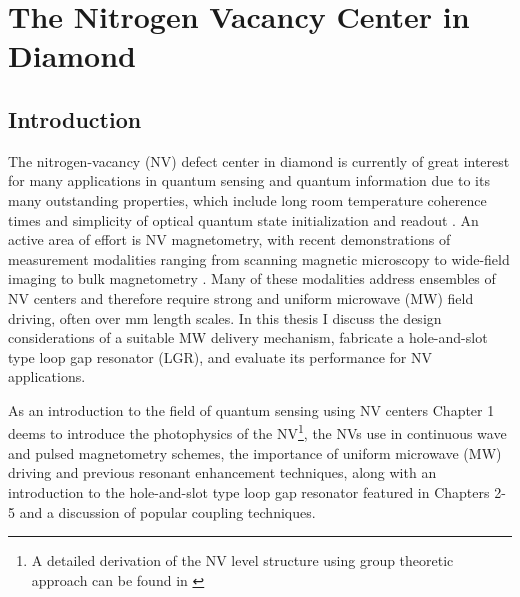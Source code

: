 
\chapter{The Nitrogen Vacancy Center in Diamond}

\section{Introduction}

The nitrogen-vacancy (NV) defect center in diamond is currently of great interest for many applications in quantum sensing \cite{taylor2008high,balasubramanian2008nanoscale,dolde2011electric,neumann2013high, degen2008scanning,hodges2013timekeeping} and quantum information \cite{childress2013diamond,gaebel2006room,dutt2007quantum} due to its many outstanding properties, which include long room temperature coherence times \cite{balasubramanian2008nanoscale} and simplicity of optical quantum state initialization and readout \cite{schirhagl2014nitrogen,jensen2017magnetometry}. An active area of effort is NV magnetometry, with recent demonstrations of measurement modalities ranging from scanning magnetic microscopy \cite{degen2008scanning} to wide-field imaging \cite{pham2011magnetic} to bulk magnetometry \cite{wolf2015subpicotesla}. Many of these modalities address ensembles of NV centers and therefore require strong and uniform microwave (MW) field driving, often over mm length scales. In this thesis I discuss the design considerations of a suitable MW delivery mechanism, fabricate a hole-and-slot type loop gap resonator (LGR), and evaluate its performance for NV applications. 

As an introduction to the field of quantum sensing using NV centers Chapter 1 deems to introduce the photophysics of the NV\footnote{A detailed derivation of the NV level structure using group theoretic approach can be found in \cite{} }, the NVs use in continuous wave and pulsed magnetometry schemes, the importance of uniform microwave (MW) driving and previous resonant enhancement techniques, along with an introduction to the hole-and-slot type loop gap resonator featured in Chapters 2-5 and a discussion of popular coupling techniques.

